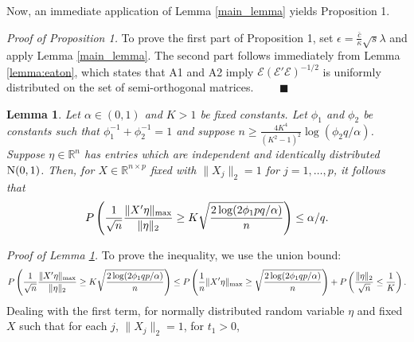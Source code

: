 \documentclass[12pt]{article}
\newtheorem{lemma}{Lemma}
\begin{document}
Now, an immediate application of Lemma \ref{main_lemma} yields Proposition 1. 
\medskip

\noindent \textit{Proof of Proposition 1.} To prove the first part of Proposition 1, set $\epsilon = \frac{\bar{c}}{\kappa}\sqrt{s}\lambda$ and apply Lemma \ref{main_lemma}. The second part follows immediately from Lemma \ref{lemma:eaton}, which states that A1 and A2 imply $\mathcal{E}(\mathcal{E}'\mathcal{E})^{-1/2}$ is uniformly distributed on the set of semi-orthogonal matrices. $\quad\quad \blacksquare$
\begin{lemma}\label{lemmaFreeLunch}
Let $\alpha \in (0,1)$ and $K > 1$ be fixed constants. Let $\phi_1$ and $\phi_2$ be constants such that $\phi_1^{-1} + \phi_2^{-1} = 1$ and suppose $n \geq \frac{4 K^4}{(K^2 - 1)^2} \log(\phi_2 q/\alpha)$. Suppose $\eta \in \mathbb{R}^n$ has entries which are independent and identically distributed ${\rm N}(0,1)$. Then, for $X \in \mathbb{R}^{n \times p}$ fixed with $\|X_j\|_2 = 1$ for $j=1, \dots, p$, it follows that 
$$ P\left(\frac{1}{\sqrt{n}} \frac{\|X'\eta\|_{\rm max}}{\|\eta\|_2} \geq   K \sqrt{\frac{2\log(2 \phi_1 pq/\alpha)}{n}} \right) \leq \alpha/q .$$
\end{lemma}
\textit{Proof of Lemma \ref{lemmaFreeLunch}.} To prove the inequality, we use the union bound:  $$
P\left(\frac{1}{\sqrt{n}}\frac{\|X'\eta\|_{\rm max}}{\|\eta\|_2} \geq K \sqrt{\frac{2 \log(2 \phi_1 qp/\alpha)}{n}}\right) \leq P\left(\frac{1}{n}\|X'\eta\|_{\rm max} \geq \sqrt{\frac{2\log(2 \phi_1 qp/\alpha)}{n}}\right) + P\left( \frac{\|\eta\|_2}{\sqrt{n}} \leq \frac{1}{K} \right).
$$ %
Dealing with the first term, for normally distributed random variable $\eta$ and fixed $X$ such that for each $j$, $\|X_j\|_2 = 1$, for $t_1 > 0$,
\end{document}

